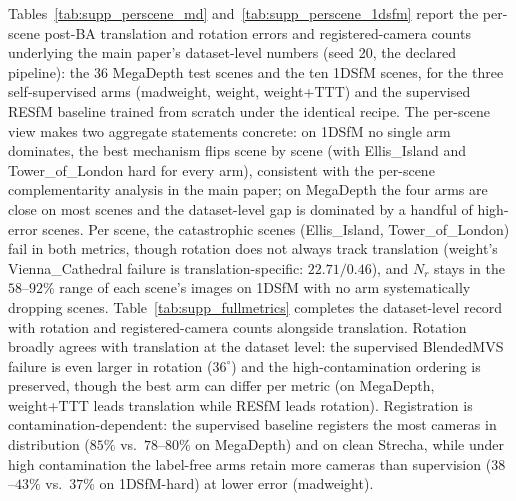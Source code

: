 \documentclass[10pt,twocolumn,letterpaper]{article}
\renewcommand{\deg}{^{\circ}}
\begin{document}
Tables~\ref{tab:supp_perscene_md} and~\ref{tab:supp_perscene_1dsfm} report the per-scene
post-BA translation and rotation errors and registered-camera counts underlying the
main paper's dataset-level numbers (seed 20, the declared pipeline): the 36 MegaDepth test scenes and the ten 1DSfM
scenes, for the three self-supervised arms (madweight, weight, weight+TTT) and the
supervised RESfM baseline trained from scratch under the identical
recipe. The per-scene view makes two aggregate statements concrete: on 1DSfM no single
arm dominates, the best mechanism flips scene by scene (with Ellis\_Island and
Tower\_of\_London hard for every arm), consistent with the per-scene complementarity
analysis in the main paper; on MegaDepth the four arms are close on most scenes and the
dataset-level gap is dominated by a handful of high-error scenes. Per scene, the
catastrophic scenes (Ellis\_Island, Tower\_of\_London) fail in both metrics, though
rotation does not always track translation (weight's Vienna\_Cathedral failure is
translation-specific: $22.71/0.46$), and $N_r$ stays in the $58$--$92\%$ range of each scene's images on 1DSfM
with no arm systematically dropping scenes.
Table~\ref{tab:supp_fullmetrics} completes the dataset-level record with rotation and
registered-camera counts alongside translation. Rotation broadly agrees with translation
at the dataset level: the supervised BlendedMVS failure is even larger in rotation
($36\deg$) and the high-contamination ordering is preserved, though the best arm can
differ per metric (on MegaDepth, weight+TTT leads translation while RESfM leads
rotation). Registration is contamination-dependent: the supervised baseline registers
the most cameras in distribution ($85\%$ vs.\ $78$--$80\%$ on MegaDepth) and on clean
Strecha, while under high contamination the label-free arms retain more cameras than
supervision ($38$--$43\%$ vs.\ $37\%$ on 1DSfM-hard) at lower error (madweight).
\end{document}
